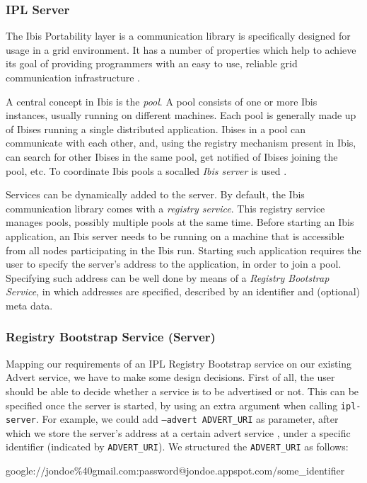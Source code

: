 \subsubsection{IPL Server}
The Ibis Portability layer is a communication library is specifically
designed for usage in a grid environment. It has a number of properties which
help to achieve its goal of providing programmers with an easy to use, reliable
grid communication infrastructure \cite{ipl-www}.

A central concept in Ibis is the \emph{pool}. A pool consists of one or more Ibis
instances, usually running on different machines. Each pool is generally made up
of Ibises running a single distributed application. Ibises in a pool can
communicate with each other, and, using the registry mechanism present in Ibis,
can search for other Ibises in the same pool, get notified of Ibises joining the
pool, etc. To coordinate Ibis pools a socalled \emph{Ibis server} is used
\cite{ipl-usersguide}.

Services can be dynamically added to the server. By default, the Ibis
communication library comes with a \emph{registry service}. This registry
service manages pools, possibly multiple pools at the same time. Before starting
an Ibis application, an Ibis server needs to be running on a machine that is
accessible from all nodes participating in the Ibis run. Starting such
application requires the user to specify the server's address to the
application, in order to join a pool. Specifying such address can be well done
by means of a \emph{Registry Bootstrap Service}, in which addresses are
specified, described by an identifier and (optional) meta data.

\subsubsection{Registry Bootstrap Service (Server)}
Mapping our requirements of an IPL Registry Bootstrap service on our existing
Advert service, we have to make some design decisions. First of all, the user
should be able to decide whether a service is to be advertised or not. This can
be specified once the server is started, by using an extra argument when calling
\texttt{ipl-server}. For example, we could add \texttt{--advert ADVERT\_URI} as
parameter, after which we store the server's address at a certain advert service
, under a specific identifier (indicated by \texttt{ADVERT\_URI}). We structured
the \texttt{ADVERT\_URI} as follows:

\begin{center}
\begin{code}
google://jondoe\%40gmail.com:password@jondoe.appspot.com/some_identifier
\end{code}
\end{center}


